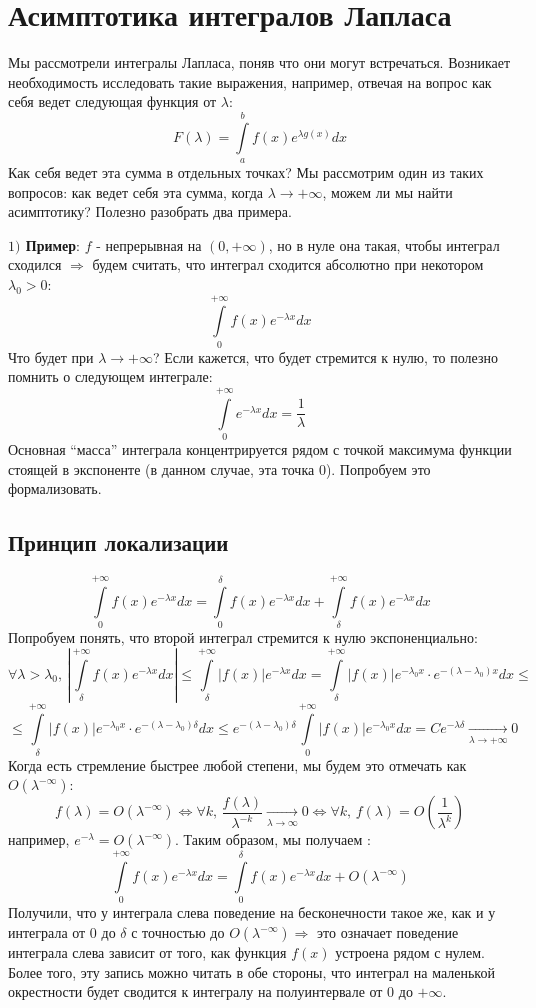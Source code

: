 \documentclass[12pt]{article}
\newcommand{\RN}[1]{%
	\textup{\uppercase\expandafter{\romannumeral#1}}%
}
\theoremstyle{definition}
\newcommand{\ddint}[2]{\displaystyle\int\limits_{#1}^{#2}}
\begin{document}
\lhead{Математический анализ - \RN{3}}

\section*{Асимптотика интегралов Лапласа}
Мы рассмотрели интегралы Лапласа, поняв что они могут встречаться. Возникает необходимость исследовать такие выражения, например, отвечая на вопрос как себя ведет следующая функция от $\lambda$:
$$
	F(\lambda) = \ddint{a}{b}f(x)e^{\lambda g(x)}dx
$$
Как себя ведет эта сумма в отдельных точках? Мы рассмотрим один из таких вопросов: как ведет себя эта сумма, когда $\lambda \to +\infty$, можем ли мы найти асимптотику? Полезно разобрать два примера.

\textbf{$1)$ Пример}: $f$ - непрерывная на $(0, +\infty)$, но в нуле она такая, чтобы интеграл сходился $\Rightarrow$ будем считать, что интеграл сходится абсолютно при некотором $\lambda_0 > 0$:
$$
	\ddint{0}{+\infty}f(x)e^{-\lambda x}dx
$$
Что будет при $\lambda \to +\infty$? Если кажется, что будет стремится к нулю, то полезно помнить о следующем интеграле:
$$
	\ddint{0}{+\infty}e^{-\lambda x}dx = \dfrac{1}{\lambda}
$$
Основная ``масса'' интеграла концентрируется рядом с точкой максимума функции стоящей в экспоненте (в данном случае, эта точка $0$). Попробуем это формализовать.

\subsection*{Принцип локализации}
$$
	\ddint{0}{+\infty}f(x)e^{-\lambda x}dx = \ddint{0}{\delta}f(x)e^{-\lambda x}dx + \ddint{\delta}{+\infty}f(x)e^{-\lambda x}dx
$$
Попробуем понять, что второй интеграл стремится к нулю экспоненциально:
$$
	\forall \lambda > \lambda_0, \, \left|\ddint{\delta}{+\infty}f(x)e^{-\lambda x}dx\right| \leq \ddint{\delta}{+\infty} |f(x)|e^{-\lambda x}dx = \ddint{\delta}{+\infty} |f(x)|e^{-\lambda_0 x }{\cdot}e^{-(\lambda - \lambda_0)x}dx \leq 
$$	
$$
	\leq \ddint{\delta}{+\infty} |f(x)|e^{-\lambda_0 x }{\cdot}e^{-(\lambda - \lambda_0)\delta}dx \leq
	e^{-(\lambda - \lambda_0)\delta} \ddint{0}{+\infty} |f(x)|e^{-\lambda_0 x}dx = Ce^{-\lambda \delta} \xrightarrow[\lambda \to +\infty]{}0
$$
Когда есть стремление быстрее любой степени, мы будем это отмечать как $O(\lambda^{-\infty})$: 
$$
	f(\lambda) = O(\lambda^{-\infty}) \Leftrightarrow \forall k, \,  \dfrac{f(\lambda)}{\lambda^{-k}} \xrightarrow[\lambda \to \infty]{}0 \Leftrightarrow \forall k, \, f(\lambda) = O\left(\dfrac{1}{\lambda^k}\right)
$$
например, $e^{-\lambda} = O(\lambda^{-\infty})$. Таким образом, мы получаем :
$$
	\ddint{0}{+\infty}f(x)e^{-\lambda x}dx = \ddint{0}{\delta}f(x)e^{-\lambda x}dx + O(\lambda^{-\infty})
$$
Получили, что у интеграла слева поведение на бесконечности такое же, как и у интеграла от $0$ до $\delta$ с точностью до $O(\lambda^{-\infty}) \Rightarrow$ это означает поведение интеграла слева зависит от того, как функция $f(x)$ устроена рядом с нулем. Более того, эту запись можно читать в обе стороны, что интеграл на маленькой окрестности будет сводится к интегралу на полуинтервале от $0$ до $+\infty$.
\end{document}
